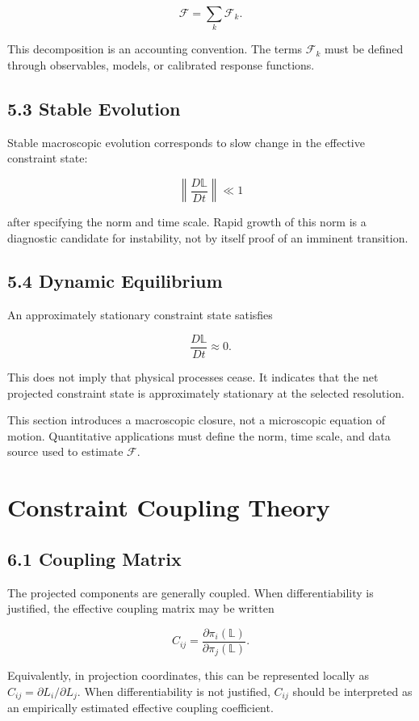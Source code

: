 \[ \mathcal{F}=\sum_k \mathcal{F}_k. \]

This decomposition is an accounting convention. The terms \(\mathcal{F}_k\) must be defined through observables, models, or calibrated response functions.

\subsection{5.3 Stable Evolution}

Stable macroscopic evolution corresponds to slow change in the effective constraint state:

\[ \left\|\frac{D\mathbb{L}}{Dt}\right\|\ll 1 \]

after specifying the norm and time scale. Rapid growth of this norm is a diagnostic candidate for instability, not by itself proof of an imminent transition.

\subsection{5.4 Dynamic Equilibrium}

An approximately stationary constraint state satisfies

\[ \frac{D\mathbb{L}}{Dt}\approx 0. \]

This does not imply that physical processes cease. It indicates that the net projected constraint state is approximately stationary at the selected resolution.

This section introduces a macroscopic closure, not a microscopic equation of motion. Quantitative applications must define the norm, time scale, and data source used to estimate \(\mathcal{F}\).




\section{Constraint Coupling Theory}


\subsection{6.1 Coupling Matrix}

The projected components are generally coupled. When differentiability is justified, the effective coupling matrix may be written

\[ C_{ij}=\frac{\partial \pi_i(\mathbb{L})}{\partial \pi_j(\mathbb{L})}. \]

Equivalently, in projection coordinates, this can be represented locally as \(C_{ij}=\partial L_i/\partial L_j\). When differentiability is not justified, \(C_{ij}\) should be interpreted as an empirically estimated effective coupling coefficient.

